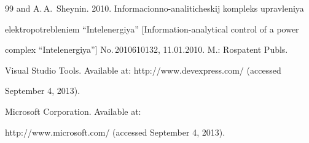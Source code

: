 {{\begin{thebibliography}{99}
{and A.\,A.~Sheynin}. 2010. Informacionno-analiticheskij kompleks upravleniya 


elektropotrebleniem ``Intelenergiya'' [Information-analytical control of a power 


complex ``Intelenergiya''] No.\,2010610132, 11.01.2010. M.: Rospatent Publs. 




Visual Studio Tools. Available at: {\sf http://www.devexpress.com/} (accessed 


September 4, 2013). 





 \label{end\stat}







Microsoft Corporation. Available at: 


{\sf http://www.microsoft.com/} (accessed September 4, 2013).


 \end{thebibliography}


} }





\renewcommand{\bibname}{\protect\rmfamily Литература}


